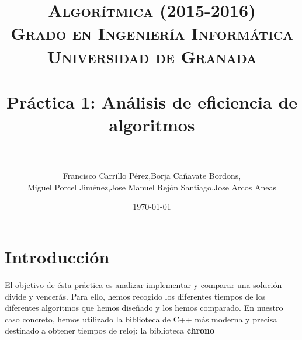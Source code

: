
 \usepackage{algpseudocode}

\title{	
\normalfont \normalsize 
\textsc{{\bf Algorítmica (2015-2016)} \\ Grado en Ingeniería Informática \\ Universidad de Granada} \\ [25pt] %
\horrule{0.5pt} \\[0.4cm] %
\huge Práctica 1: Análisis de eficiencia de algoritmos \\ %
\horrule{2pt} \\[0.5cm] %
}

\author{Francisco Carrillo Pérez,Borja Cañavate Bordons, \\Miguel Porcel Jiménez,Jose Manuel Rejón Santiago,Jose Arcos Aneas} %

\date{\normalsize\today} %




\maketitle %

\newpage %

\tableofcontents %

\listoffigures

\listoftables

\newpage

\section{Introducción }

El objetivo de ésta práctica es analizar implementar y comparar una solución divide y vencerás.
Para ello, hemos recogido los diferentes tiempos de los diferentes algoritmos que hemos diseñado y los hemos comparado.
En nuestro caso concreto, hemos utilizado la biblioteca de C++ más moderna y precisa destinado a obtener tiempos de reloj: la biblioteca \textbf{chrono}

